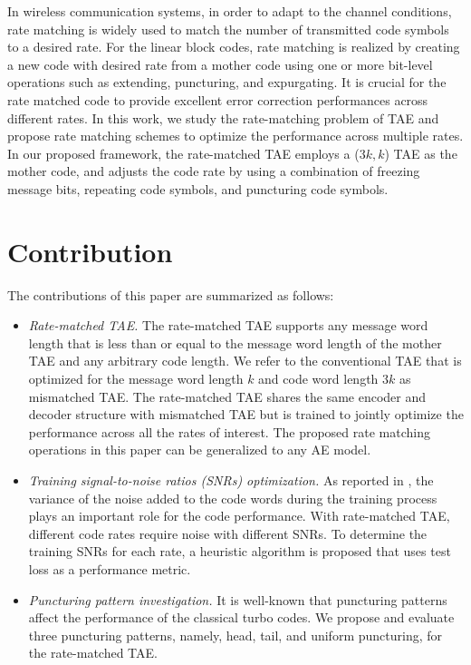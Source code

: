 \documentclass [PhD] {uclathes}
\begin{document}
In wireless communication systems, in order to adapt to the channel conditions, rate matching is widely used to match the number of transmitted code symbols to a desired rate. For the linear block codes, rate matching is realized by creating a new code with desired rate from a mother code using one or more bit-level operations such as extending, puncturing, and expurgating\cite{blahut2003algebraic}. It is crucial for the rate matched code to provide excellent error correction performances across different rates. In this work, we study the rate-matching problem of TAE and propose rate matching schemes to optimize the performance across multiple rates. In our proposed framework, the rate-matched TAE employs a ($3k,k$) TAE as the mother code, and adjusts the code rate by using a combination of freezing message bits, repeating code symbols, and puncturing code symbols. 

\section{Contribution}
The contributions of this paper are summarized as follows:

\begin{itemize}
    \item \textit{Rate-matched TAE.} The rate-matched TAE supports any message word length that is less than or equal to the message word length of the mother TAE and any arbitrary code length. We refer to the conventional TAE that is optimized for the message word length $k$ and code word length $3k$ as mismatched TAE. The rate-matched TAE shares the same encoder and decoder structure with mismatched TAE but is trained to jointly optimize the performance across all the rates of interest. The proposed rate matching operations in this paper can be generalized to any AE model. 
    \item \textit{Training signal-to-noise ratios (SNRs) optimization.} As reported in \cite{jiang2019turbo}, the variance of the noise added to the code words during the training process plays an important role for the code performance. With rate-matched TAE, different code rates require noise with different SNRs. To determine the training SNRs for each rate, a heuristic algorithm is proposed that uses test loss as a performance metric.
    \item \textit{Puncturing pattern investigation.} It is well-known that puncturing patterns affect the performance of the classical turbo codes. We propose and evaluate three puncturing patterns, namely, head, tail, and uniform puncturing, for the rate-matched TAE.
\end{itemize}
\end{document}
